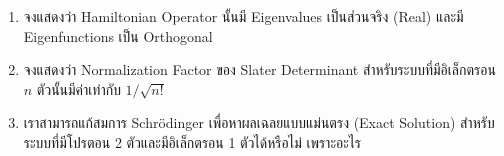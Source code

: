 \begin{enumerate}[topsep=0pt,noitemsep]
  \setlength\itemsep{1em}
  \item จงแสดงว่า Hamiltonian Operator นั้นมี Eigenvalues เป็นส่วนจริง (Real) และมี Eigenfunctions เป็น Orthogonal

  \item จงแสดงว่า Normalization Factor ของ Slater Determinant สำหรับระบบที่มีอิเล็กตรอน $n$ ตัวนั้นมีค่าเท่ากับ $1 / \sqrt{n!}$

  \item เราสามารถแก้สมการ Schr\"{o}dinger เพื่อหาผลเฉลยแบบแม่นตรง (Exact Solution) สำหรับระบบที่มีโปรตอน 2 ตัวและมีอิเล็กตรอน
        1 ตัวได้หรือไม่ เพราะอะไร
\end{enumerate}
